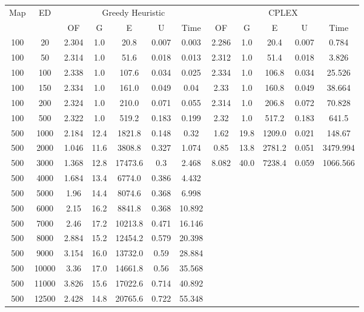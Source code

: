 \begin{table}[htb]
	\centering
	\begin{tabular}{|c|c|c|c|c|c|c|c|c|c|c|c|}
		\hline
		\multirow{2}{*}{Map} & \multirow{2}{*}{ED} & \multicolumn{5}{c|}{Greedy Heuristic} & \multicolumn{5}{c|}{CPLEX}\\ 
		\cline{3-12}
&& OF & G & E & U & Time & OF & G & E & U & Time\\ 
		\hline
		100 & 20 & 2.304 & 1.0 & 20.8 & 0.007 & 0.003 & 2.286 & 1.0 & 20.4 & 0.007 & 0.784 \\ 
		100 & 50 & 2.314 & 1.0 & 51.6 & 0.018 & 0.013 & 2.312 & 1.0 & 51.4 & 0.018 & 3.826 \\ 
		100 & 100 & 2.338 & 1.0 & 107.6 & 0.034 & 0.025 & 2.334 & 1.0 & 106.8 & 0.034 & 25.526 \\ 
		100 & 150 & 2.334 & 1.0 & 161.0 & 0.049 & 0.04 & 2.33 & 1.0 & 160.8 & 0.049 & 38.664 \\ 
		100 & 200 & 2.324 & 1.0 & 210.0 & 0.071 & 0.055 & 2.314 & 1.0 & 206.8 & 0.072 & 70.828 \\ 
		100 & 500 & 2.322 & 1.0 & 519.2 & 0.183 & 0.199 & 2.32 & 1.0 & 517.2 & 0.183 & 641.5 \\ 
		500 & 1000 & 2.184 & 12.4 & 1821.8 & 0.148 & 0.32 & 1.62 & 19.8 & 1209.0 & 0.021 & 148.67 \\ 
		500 & 2000 & 1.046 & 11.6 & 3808.8 & 0.327 & 1.074 & 0.85 & 13.8 & 2781.2 & 0.051 & 3479.994 \\ 
		500 & 3000 & 1.368 & 12.8 & 17473.6 & 0.3 & 2.468 & 8.082 & 40.0 & 7238.4 & 0.059 & 1066.566 \\ 
		500 & 4000 & 1.684 & 13.4 & 6774.0 & 0.386 & 4.432 & & & & &  \\ 
		500 & 5000 & 1.96 & 14.4 & 8074.6 & 0.368 & 6.998 & & & & &  \\ 
		500 & 6000 & 2.15 & 16.2 & 8841.8 & 0.368 & 10.892 & & & & &  \\ 
		500 & 7000 & 2.46 & 17.2 & 10213.8 & 0.471 & 16.146 & & & & &  \\ 
		500 & 8000 & 2.884 & 15.2 & 12454.2 & 0.579 & 20.398 & & & & &  \\ 
		500 & 9000 & 3.154 & 16.0 & 13732.0 & 0.59 & 28.884 & & & & &  \\ 
		500 & 10000 & 3.36 & 17.0 & 14661.8 & 0.56 & 35.568 & & & & &  \\ 
		500 & 11000 & 3.826 & 15.6 & 17022.6 & 0.714 & 40.892 & & & & &  \\ 
		500 & 12500 & 2.428 & 14.8 & 20765.6 & 0.722 & 55.348 & & & & &  \\ 

\end{tabular}
\end{table}
